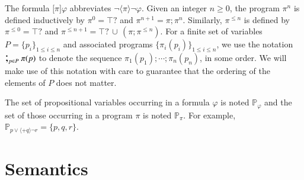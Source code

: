 \documentclass{llncs}
\newcommand{\atm}{x}
\newcommand{\testpdl}{?}				%
\newcommand{\assgn}[2]{{#1 {:=} #2}}
\newcommand{\assgntopV}[1]{{\mathtt {+} #1}}
\newcommand{\ifthen}[2]{\mathbf{if}\ #1 \ \mathbf{then}\ #2}
\newcommand{\lbox}[1]{ \big[ #1 \big] }
\newcommand{\ldia}[1]{ \big\langle #1 \big\rangle}
\newcommand{\ndet}{\,{\cup}\,}
\renewcommand{\phi}{\varphi}
\newcommand{\propset}{\mathbb P}
\newcommand{\propsetOf}[1]{\propset_{#1}}
\newcommand{\seqseq}[1]{ \text{\Large ;}_{#1} ~ }
\begin{document}
The formula $\lbox \pi \phi$ abbreviates $\lnot \ldia \pi \lnot \phi$.
Given an integer $n \geq 0$, the program $\pi^n$ is defined inductively by 
$\pi^0 = \top \testpdl $ and 
$\pi^{n+1} = \pi ; \pi^n $. 
Similarly, $\pi^{\leq n}$ is defined by 
$\pi^{\leq 0} = \top \testpdl $ and 
$\pi^{\leq n+1} = \top \testpdl \ndet (\pi ; \pi^{\leq n}) $. 
For a finite set of variables 
$P = \{p_i\}_{1 \leq  i \leq n}$ 
and associated programs 
$\{ \pi_i(p_i)\}_{1 \leq  i \leq n}$,
we use the notation
$\seqseq{p \in P} \pi(p)$ to denote the sequence
$ \pi_1(p_1) ; \cdots ; \pi_n(p_n)$, in some order. 
We will make use of this notation with care to guarantee that the ordering of the elements of $P$ does not matter. 

The set of propositional variables occurring in a formula $\phi$ 
is noted $\propsetOf \phi $ and 
the set of those occurring in a program $\pi$ is noted $\propsetOf \pi $. 
For example, $\propsetOf{ p \lor \ldia{\assgntopV{q} } \lnot r } = \{p,q,r\}$. 


\section{Semantics}\label{sec:interpretation} 

\end{document}
